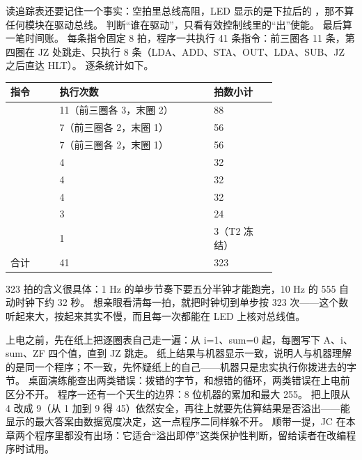 
读追踪表还要记住一个事实：空拍里总线高阻，LED 显示的是下拉后的 ，那不算任何模块在驱动总线。
判断“谁在驱动”，只看有效控制线里的“出”使能。
最后算一笔时间账。
每条指令固定 8 拍，程序一共执行 41 条指令：前三圈各 11 条，第四圈在 JZ 处跳走、只执行 8 条（LDA、ADD、STA、OUT、LDA、SUB、JZ 之后直达 HLT）。
逐条统计如下。

\begin{longtable}{L{0.14\linewidth}L{0.44\linewidth}L{0.18\linewidth}}
\toprule
指令 & 执行次数 & 拍数小计 \\
\midrule
{} & 11（前三圈各 3，末圈 2） & 88 \\
 & 7（前三圈各 2，末圈 1） & 56 \\
 & 7（前三圈各 2，末圈 1） & 56 \\
 & 4 & 32 \\
 & 4 & 32 \\
 & 4 & 32 \\
 & 3 & 24 \\
 & 1 & 3（T2 冻结） \\
合计 & 41 & 323 \\
\bottomrule
\end{longtable}

323 拍的含义很具体：1 Hz 的单步节奏下要五分半钟才能跑完，10 Hz 的 555 自动时钟下约 32 秒。
想亲眼看清每一拍，就把时钟切到单步按 323 次——这个数听起来大，按起来其实不慢，而且每一次都能在 LED 上核对总线值。

上电之前，先在纸上把逐圈表自己走一遍：从 i=1、sum=0 起，每圈写下 A、i、sum、ZF 四个值，直到 JZ 跳走。
纸上结果与机器显示一致，说明人与机器理解的是同一个程序；不一致，先怀疑纸上的自己——机器只是忠实执行你拨进去的字节。
桌面演练能查出两类错误：拨错的字节，和想错的循环，两类错误在上电前区分不开。
程序一还有一个天生的边界：8 位机器的累加和最大 255。
把上限从 4 改成 9（从 1 加到 9 得 45）依然安全，再往上就要先估算结果是否溢出——能显示的最大答案由数据宽度决定，这一点程序二同样躲不开。
顺带一提，JC 在本章两个程序里都没有出场：它适合“溢出即停”这类保护性判断，留给读者在改编程序时试用。

